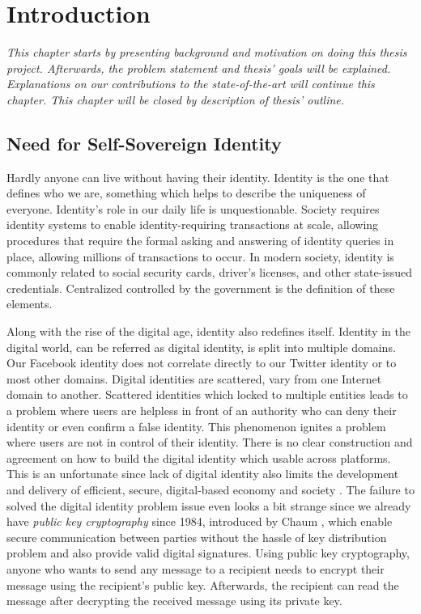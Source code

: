 \chapter{Introduction}

\textit{This chapter starts by presenting background and motivation on doing this thesis project. Afterwards, the problem statement and thesis' goals will be explained. Explanations on our contributions to the state-of-the-art will continue this chapter. This chapter will be closed by description of thesis' outline.}

\section{Need for Self-Sovereign Identity}
Hardly anyone can live without having their identity. Identity is the one that defines who we are, something which helps to describe the uniqueness of everyone.
Identity's role in our daily life is unquestionable. Society requires identity systems to enable identity-requiring transactions at scale, allowing procedures that require the formal asking and answering of identity queries in place, allowing millions of transactions to occur.
In modern society, identity is commonly related to social security cards, driver's licenses, and other state-issued credentials. Centralized controlled by the government is the definition of these elements.

Along with the rise of the digital age, identity also redefines itself. Identity in the digital world, can be referred as digital identity, is split into multiple domains. Our Facebook identity does not correlate directly to our Twitter identity or to most other domains. Digital identities are scattered, vary from one Internet domain to another. Scattered identities which locked to multiple entities leads to a problem where users are helpless in front of an authority who can deny their identity or even confirm a false identity. This phenomenon ignites a problem where users are not in control of their identity.
There is no clear construction and agreement on how to build the digital identity which usable across platforms. This is an unfortunate since lack of digital identity also limits the development and delivery of efficient, secure, digital-based economy and society \cite{blueprint}. The failure to solved the digital identity problem issue even looks a bit strange since we already have \textit{public key cryptography} since 1984, introduced by Chaum \cite{chaum}, which enable secure communication between parties without the hassle of key distribution problem and also provide valid digital signatures. Using public key cryptography, anyone who wants to send any message to a recipient needs to encrypt their message using the recipient's public key. Afterwards, the recipient can read the message after decrypting the received message using its private key.

